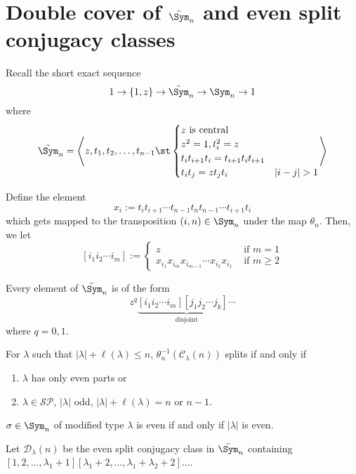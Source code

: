 \documentclass[11pt,leqno,oneside]{amsbook}
\newcommand{\SP}{\mathcal{SP}} %
\newcommand{\CC}{\mathcal{C}} %
\renewcommand{\D}{\mathcal{D}} %
\numberwithin{thm}{section}
\begin{document}
\section{Double cover of \(\tilde{\Sym}_n\) and even split conjugacy
  classes}
Recall the short exact sequence \[
  1 \to \{1,z\} \to \tilde{\Sym}_n \to \Sym_n \to 1
\]
where \[
  \tilde{\Sym}_n = \left\langle z,t_1,t_2,\ldots,t_{n-1} \st
  \begin{cases}
    z \text{ is central}\\
    z^2 = 1, t_i^2 = z\\
    t_i t_{i+1} t_i = t_{i+1} t_i t_{i+1} \\
    t_i t_j = z t_j t_i & |i-j|>1
  \end{cases}
\right\rangle
\]
\begin{defn}
  Define the element \[
    x_i := t_i t_{i+1} \cdots t_{n-1} t_n t_{n-1} \cdots t_{i+1} t_i
  \]
  which gets mapped to the transposition \((i,n) \in \Sym_n\) under
  the map \(\theta_n\). Then, we let \[
    [i_1 i_2 \cdots i_m] :=
    \begin{cases}
      z & \text{ if } m=1\\
      x_{i_1} x_{i_m} x_{i_{m-1}} \cdots x_{i_2} x_{i_1} & \text{ if }
      m \geq 2
    \end{cases}
  \]
\end{defn}
\begin{prop}
  Every element of \(\tilde{\Sym}_n\) is of the form \[
    z^q \underbrace{[i_1 i_2 \cdots i_m][j_1 j_2 \cdots j_k] \cdots}_{\text{disjoint}}
  \]
  where \(q=0,1\).
\end{prop}
\begin{lem}
  For \(\lambda\) such that \(|\lambda|+\ell(\lambda) \leq n\), \(
  \theta_n^{-1}(\CC_\lambda(n)) \) splits if and only if
  \begin{enumerate}
  \item \(\lambda\) has only even parts or
  \item \(\lambda \in \SP\), \(|\lambda|\) odd,
    \(|\lambda|+\ell(\lambda) = n\) or \(n-1\).
  \end{enumerate}
\end{lem}
\begin{prop}
  \(\sigma \in \Sym_n\) of modified type \(\lambda\) is even if and
  only if \(|\lambda|\) is even.
\end{prop}
\begin{defn}
  Let \(\D_\lambda(n)\) be the even split conjugacy class in
  \(\tilde{\Sym}_n\) containing
  \([1,2,\ldots,\lambda_1+1][\lambda_1+2,\ldots,
  \lambda_1+\lambda_2+2] \ldots\).
\end{defn}
\end{document}
